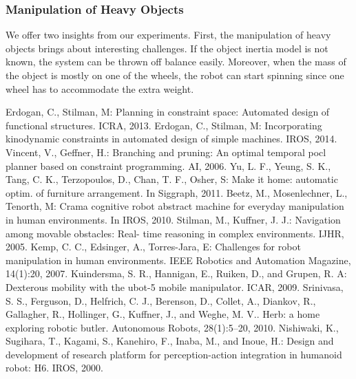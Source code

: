 \documentclass[runningheads,a4paper]{llncs}
\begin{document}
\subsubsection{Manipulation of Heavy Objects}

We offer two insights from our experiments. First, the manipulation of heavy objects brings about
interesting challenges. If the object inertia model is not known, the system can be thrown off
balance easily. Moreover, when the mass of the object is mostly on one of the wheels, the robot can
start spinning since one wheel has to accommodate the extra weight. 

\newpage
% 
% 

\begin{thebibliography}{27}

 Erdogan, C., Stilman, M: Planning in constraint space: Automated design of
functional structures. ICRA, 2013.
 Erdogan, C., Stilman, M: Incorporating kinodynamic constraints in automated
design of simple machines. IROS, 2014.
 Vincent, V., Geffner, H.: Branching and pruning: An optimal temporal pocl planner
based on constraint programming. AI, 2006.
 Yu, L. F., Yeung, S. K., Tang, C. K., Terzopoulos, D., Chan, T. F., Osher, S: Make it home:
automatic optim. of furniture arrangement. In Siggraph, 2011.
 Beetz, M., Mosenlechner, L., Tenorth, M: Crama cognitive robot
abstract machine for everyday manipulation in human environments. In IROS,
2010.
 Stilman, M., Kuffner, J. J.: Navigation among movable obstacles: Real-
time reasoning in complex environments. IJHR, 2005.
 Kemp, C. C., Edsinger, A., Torres-Jara, E: Challenges for robot
manipulation in human environments. IEEE Robotics and Automation Magazine,
14(1):20, 2007.
 Kuindersma, S. R., Hannigan, E., Ruiken, D., and Grupen, R. A:
Dexterous mobility with the ubot-5 mobile manipulator. ICAR, 2009.
  Srinivasa, S. S., Ferguson, D., Helfrich, C. J., Berenson, D., 
Collet, A., Diankov, R., Gallagher, R., Hollinger, G., Kuffner, J., and
Weghe, M. V.. Herb: a home exploring robotic butler. Autonomous Robots,
28(1):5–20, 2010.
 Nishiwaki, K., Sugihara, T., Kagami, S., Kanehiro, F.,
Inaba, M., and Inoue, H.: Design and development of research platform for perception-action 
integration in humanoid robot: H6. IROS, 2000.

\end{thebibliography}
\end{document}
